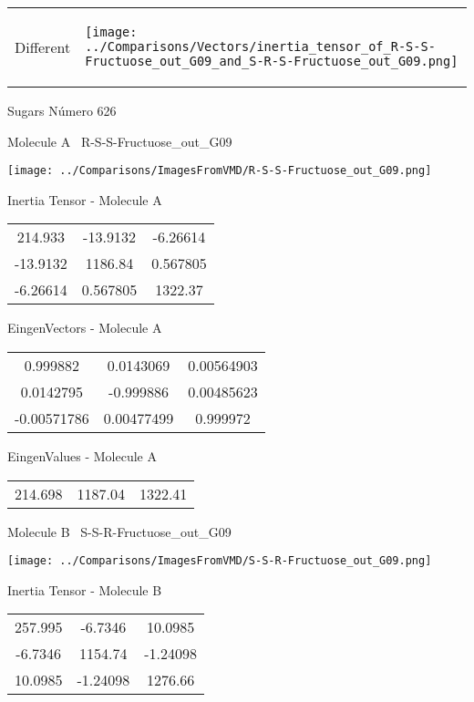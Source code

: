 \vtab[-5mm]
\begin{tabular}{*{2}{m{}}}
\begin{center}
\textcolor{NavyBlue}{\Large Different}
\end{center}
&
\begin{center}
\texttt{[image: ../Comparisons/Vectors/inertia\_tensor\_of\_R-S-S-Fructuose\_out\_G09\_and\_S-R-S-Fructuose\_out\_G09.png]}
\end{center}
\end{tabular}

 \newpage

\vtab[-3cm]
\begin{center}
{\large Sugars \tab Número 626}
\end{center}
\begin{multicols}{2}
\begin{center}

Molecule A \
R-S-S-Fructuose\_out\_G09

\texttt{[image: ../Comparisons/ImagesFromVMD/R-S-S-Fructuose\_out\_G09.png]}

Inertia Tensor - Molecule A \\
\begin{tabular}{|c c c|}
214.933	 & 	-13.9132	 & 	-6.26614	 \\
-13.9132	 & 	1186.84	 & 	0.567805	 \\
-6.26614	 & 	0.567805	 & 	1322.37
\end{tabular}

\vtab
 EingenVectors - Molecule A     \\
\begin{tabular}{|c c c|}
0.999882	 & 	0.0143069	 & 	0.00564903	 \\
0.0142795	 & 	-0.999886	 & 	0.00485623	 \\
-0.00571786	 & 	0.00477499	 & 	0.999972
\end{tabular}

\vtab
 EingenValues - Molecule A     \\
\begin{tabular}{|c c c|}
214.698	 & 	1187.04	 & 	1322.41	 \\
\end{tabular}
\columnbreak

Molecule B \
S-S-R-Fructuose\_out\_G09

\texttt{[image: ../Comparisons/ImagesFromVMD/S-S-R-Fructuose\_out\_G09.png]}

Inertia Tensor - Molecule B \\
\begin{tabular}{|c c c|}
257.995	 & 	-6.7346	 & 	10.0985	 \\
-6.7346	 & 	1154.74	 & 	-1.24098	 \\
10.0985	 & 	-1.24098	 & 	1276.66
\end{tabular}


\end{center}
\end{multicols}
